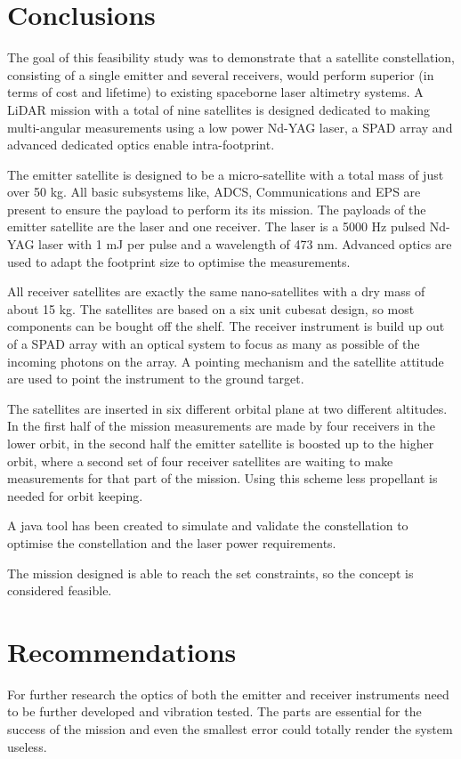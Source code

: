 \section{Conclusions}
\label{frCRconclusions}
The goal of this feasibility study was to demonstrate that a satellite constellation, consisting of a single emitter and several receivers, would perform
superior (in terms of cost and lifetime) to existing spaceborne laser altimetry systems. A \ac{LiDAR} mission with a total of nine satellites is designed dedicated to making multi-angular measurements using a low power \ac{Nd-YAG} \ac{laser}, a \ac{SPAD} array and advanced dedicated optics enable intra-footprint. 

The emitter satellite is designed to be a micro-satellite with a total mass of just over 50 kg. All basic subsystems like, \ac{ADCS}, Communications and \ac{EPS} are present to ensure the payload to perform its its mission. The payloads of the emitter satellite are the \ac{laser} and one receiver. The \ac{laser} is a 5000 Hz pulsed \ac{Nd-YAG} \ac{laser} with 1 mJ per pulse and a wavelength of 473 nm. Advanced optics are used to adapt the footprint size to optimise the measurements.

All receiver satellites are exactly the same nano-satellites with a dry mass of about 15 kg. The satellites are based on a six unit cubesat design, so most components can be bought off the shelf. The receiver instrument is build up out of a \ac{SPAD} array with an optical system to focus as many as possible of the incoming photons on the array. A pointing mechanism and the satellite attitude are used to point the instrument to the ground target.

The satellites are inserted in six different orbital plane at two different altitudes. In the first half of the mission measurements are made by four receivers in the lower orbit, in the second half the emitter satellite is boosted up to the higher orbit, where a second set of four receiver satellites are waiting to make measurements for that part of the mission. Using this scheme less propellant is needed for orbit keeping.

A java tool has been created to simulate and validate the constellation to optimise the constellation and the laser power requirements.

The mission designed is able to reach the set constraints, so the concept is considered feasible.

\section{Recommendations}
\label{frCRrecommendations}
For further research the optics of both the emitter and receiver instruments need to be further developed and vibration tested. The parts are essential for the success of the mission and even the smallest error could totally render the system useless.

